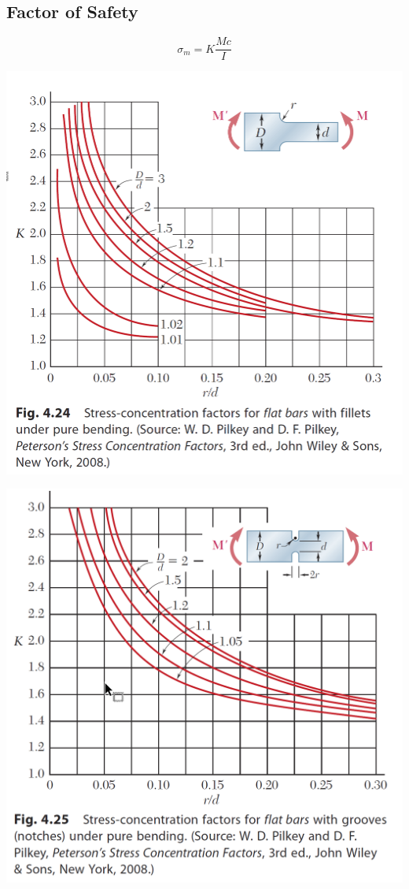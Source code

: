\documentclass[10pt,landscape]{article}
\newenvironment{Figure}
     {\par\medskip\noindent\minipage{\linewidth}}
     {\endminipage\par\medskip}
\begin{document}
\begin{multicols}{3}
\subsection{Factor of Safety}
\begin{equation}
    \sigma_m=K\frac{Mc}{I}
\end{equation}
\begin{Figure}
    \centering
    \includegraphics[width=\linewidth]{Fig_4_24.png}
\end{Figure}
\begin{Figure}
    \centering
    \includegraphics[width=\linewidth]{Fig_4_25.png}
\end{Figure}

\end{multicols}
\end{document}
